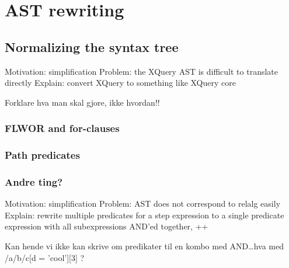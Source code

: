 \section{AST rewriting}
\subsection{Normalizing the syntax tree}
Motivation: simplification
Problem: the XQuery AST is difficult to translate directly
Explain: convert XQuery to something like XQuery core

Forklare hva man skal gjore, ikke hvordan!!

\subsubsection{FLWOR and for-clauses}
\subsubsection{Path predicates}
\subsubsection{Andre ting?}
 
Motivation: simplification
Problem: AST does not correspond to relalg easily
Explain: rewrite multiple predicates for a step expression to a single 
         predicate expression with all subexpressions AND'ed together, ++
         
Kan hende vi ikke kan skrive om predikater til en kombo med AND\ldots hva med
/a/b/c[d = 'cool'][3] ?
